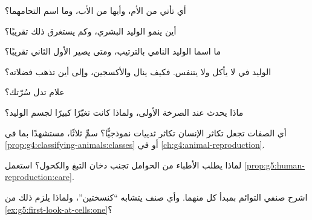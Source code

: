 \begin{exercise}[$\star$]\label{exo:g5:human-reproduction:1}
أي  تأتي من الأم، وأيها من الأب، وما اسم التحامهما؟
\end{exercise}

\begin{exercise}[$\star$]\label{exo:g5:human-reproduction:2}
أين ينمو الوليد البشري، وكم يستغرق ذلك تقريبًا؟
\end{exercise}

\begin{exercise}[$\star$]\label{exo:g5:human-reproduction:3}
ما اسما الوليد النامي بالترتيب، ومتى يصير الأول الثاني تقريبًا؟
\end{exercise}

\begin{exercise}[$\star$]\label{exo:g5:human-reproduction:4}
الوليد في  لا يأكل ولا يتنفس. فكيف ينال  والأكسجين،
وإلى أين تذهب فضلاته؟
\end{exercise}

\begin{exercise}[$\star$]\label{exo:g5:human-reproduction:5}
علام تدل سُرّتك؟
\end{exercise}

\begin{exercise}[$\star$]\label{exo:g5:human-reproduction:6}
ماذا يحدث عند الصرخة الأولى، ولماذا كانت تغيّرًا كبيرًا لجسم
الوليد؟
\end{exercise}

\begin{exercise}[$\star$]\label{exo:g5:human-reproduction:7}
أي الصفات تجعل تكاثر الإنسان تكاثر ثدييات نموذجيًّا؟ سمِّ ثلاثًا،
مستشهدًا بما في \cref{prop:g4:classifying-animals:classes} أو
في \cref{ch:g4:animal-reproduction}.
\end{exercise}

\begin{exercise}[$\star$]\label{exo:g5:human-reproduction:8}
لماذا يطلب الأطباء من الحوامل تجنب دخان التبغ والكحول؟ استعمل
\cref{prop:g5:human-reproduction:care}.
\end{exercise}

\begin{exercise}[$\star\star$]\label{exo:g5:human-reproduction:9}
اشرح صنفي التوائم بمبدأ كل منهما. وأي صنف يتشابه ``كنسختين''،
ولماذا يلزم ذلك من \cref{ex:g5:first-look-at-cells:one}؟
\end{exercise}

